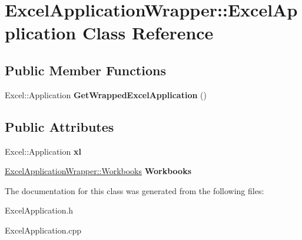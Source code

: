 \hypertarget{class_excel_application_wrapper_1_1_excel_application}{}\section{Excel\+Application\+Wrapper\+:\+:Excel\+Application Class Reference}
\label{class_excel_application_wrapper_1_1_excel_application}
\subsection*{Public Member Functions}
\begin{DoxyCompactItemize}
\item 
\hypertarget{class_excel_application_wrapper_1_1_excel_application_aeda6c047f9daed63f342c0fd074a2b08}{}Excel\+::\+Application {\bfseries Get\+Wrapped\+Excel\+Application} ()\label{class_excel_application_wrapper_1_1_excel_application_aeda6c047f9daed63f342c0fd074a2b08}

\end{DoxyCompactItemize}
\subsection*{Public Attributes}
\begin{DoxyCompactItemize}
\item 
\hypertarget{class_excel_application_wrapper_1_1_excel_application_a2c8b69990a092a3a645ea14fb16b54dd}{}Excel\+::\+Application {\bfseries xl}\label{class_excel_application_wrapper_1_1_excel_application_a2c8b69990a092a3a645ea14fb16b54dd}

\item 
\hypertarget{class_excel_application_wrapper_1_1_excel_application_a7d9fda997d41e5d0b51e7595ba4828ce}{}\hyperlink{class_excel_application_wrapper_1_1_workbooks}{Excel\+Application\+Wrapper\+::\+Workbooks} {\bfseries Workbooks}\label{class_excel_application_wrapper_1_1_excel_application_a7d9fda997d41e5d0b51e7595ba4828ce}

\end{DoxyCompactItemize}


The documentation for this class was generated from the following files\+:\begin{DoxyCompactItemize}
\item 
Excel\+Application.\+h\item 
Excel\+Application.\+cpp\end{DoxyCompactItemize}
